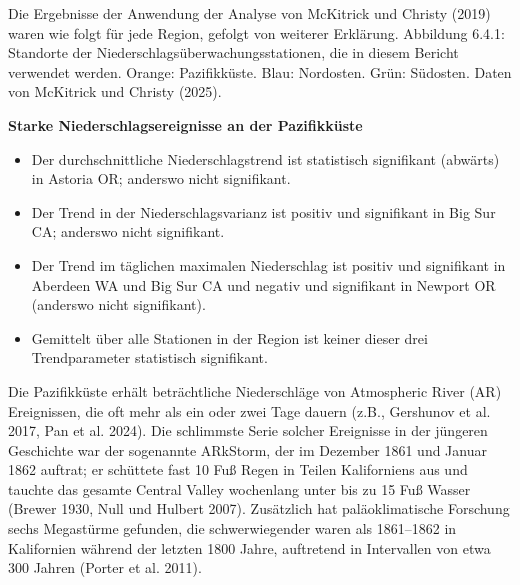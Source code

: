 \documentclass[12pt,paper=a4,DIV=12,parskip=never,chapterprefix=false,headings=standardclasses]{scrreprt}
\begin{document}
Die Ergebnisse der Anwendung der Analyse von McKitrick und Christy (2019) waren wie folgt für jede Region, gefolgt von weiterer Erklärung.
Abbildung 6.4.1: Standorte der Niederschlagsüberwachungsstationen, die in diesem Bericht verwendet werden. Orange: Pazifikküste. Blau: Nordosten. Grün: Südosten. Daten von McKitrick und Christy (2025).


\textbf{Starke Niederschlagsereignisse an der Pazifikküste}
\begin{itemize}
\item Der durchschnittliche Niederschlagstrend ist statistisch signifikant (abwärts) in Astoria OR; anderswo nicht signifikant. 
\item Der Trend in der Niederschlagsvarianz ist positiv und signifikant in Big Sur CA; anderswo nicht signifikant. 
\item Der Trend im täglichen maximalen Niederschlag ist positiv und signifikant in Aberdeen WA und Big Sur CA und negativ und signifikant in Newport OR (anderswo nicht signifikant). 
\item Gemittelt über alle Stationen in der Region ist keiner dieser drei Trendparameter statistisch signifikant.  
\end{itemize}

Die Pazifikküste erhält beträchtliche Niederschläge von Atmospheric River (AR) Ereignissen, die oft mehr als ein oder zwei Tage dauern (z.B., Gershunov et al. 2017, Pan et al. 2024). Die schlimmste Serie solcher Ereignisse in der jüngeren Geschichte war der sogenannte ARkStorm, der im Dezember 1861 und Januar 1862 auftrat; er schüttete fast 10 Fuß Regen in Teilen Kaliforniens aus und tauchte das gesamte Central Valley wochenlang unter bis zu 15 Fuß Wasser (Brewer 1930, Null und Hulbert 2007). Zusätzlich hat paläoklimatische Forschung sechs Megastürme gefunden, die schwerwiegender waren als 1861–1862 in Kalifornien während der letzten 1800 Jahre, auftretend in Intervallen von etwa 300 Jahren (Porter et al. 2011).
\end{document}
